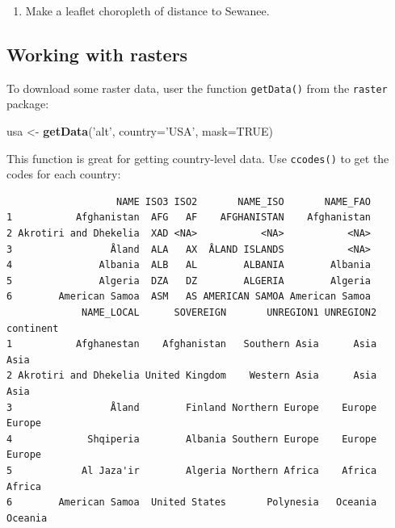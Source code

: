 \documentclass[]{book}
\newenvironment{Shaded}{\begin{snugshade}}{\end{snugshade}}
\newcommand{\DataTypeTok}[1]{\textcolor[rgb]{0.13,0.29,0.53}{#1}}
\newcommand{\KeywordTok}[1]{\textcolor[rgb]{0.13,0.29,0.53}{\textbf{#1}}}
\newcommand{\NormalTok}[1]{#1}
\newcommand{\OperatorTok}[1]{\textcolor[rgb]{0.81,0.36,0.00}{\textbf{#1}}}
\newcommand{\OtherTok}[1]{\textcolor[rgb]{0.56,0.35,0.01}{#1}}
\newcommand{\StringTok}[1]{\textcolor[rgb]{0.31,0.60,0.02}{#1}}
\providecommand{\tightlist}{%
  \setlength{\itemsep}{0pt}\setlength{\parskip}{0pt}}
\begin{document}
\begin{enumerate}
\def\labelenumi{\arabic{enumi}.}
\setcounter{enumi}{27}
\tightlist
\item
  Make a leaflet choropleth of distance to Sewanee.
\end{enumerate}

\hypertarget{working-with-rasters}{%
\subsection*{Working with rasters}\label{working-with-rasters}}

To download some raster data, user the function \texttt{getData()} from the \texttt{raster} package:

\begin{Shaded}
\begin{Highlighting}[]
\NormalTok{usa <-}\StringTok{ }\KeywordTok{getData}\NormalTok{(}\StringTok{'alt'}\NormalTok{, }\DataTypeTok{country=}\StringTok{'USA'}\NormalTok{, }\DataTypeTok{mask=}\OtherTok{TRUE}\NormalTok{)}
\end{Highlighting}
\end{Shaded}

This function is great for getting country-level data. Use \texttt{ccodes()} to get the codes for each country:

\begin{Shaded}
\end{Shaded}

\begin{verbatim}
                   NAME ISO3 ISO2       NAME_ISO       NAME_FAO
1           Afghanistan  AFG   AF    AFGHANISTAN    Afghanistan
2 Akrotiri and Dhekelia  XAD <NA>           <NA>           <NA>
3                 Åland  ALA   AX  ÅLAND ISLANDS           <NA>
4               Albania  ALB   AL        ALBANIA        Albania
5               Algeria  DZA   DZ        ALGERIA        Algeria
6        American Samoa  ASM   AS AMERICAN SAMOA American Samoa
             NAME_LOCAL      SOVEREIGN       UNREGION1 UNREGION2 continent
1           Afghanestan    Afghanistan   Southern Asia      Asia      Asia
2 Akrotiri and Dhekelia United Kingdom    Western Asia      Asia      Asia
3                 Åland        Finland Northern Europe    Europe    Europe
4             Shqiperia        Albania Southern Europe    Europe    Europe
5            Al Jaza'ir        Algeria Northern Africa    Africa    Africa
6        American Samoa  United States       Polynesia   Oceania   Oceania
\end{verbatim}
\end{document}
